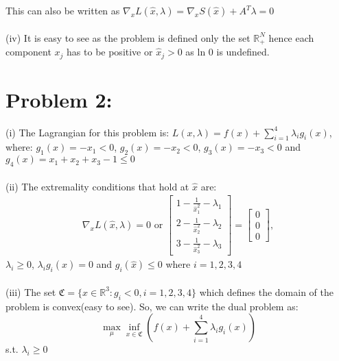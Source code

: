\documentclass[12pt]{report}
\begin{document}
This can also be written as $\nabla_x L(\hat{x},\lambda) = \nabla_xS(\hat{x})+A^T\lambda=0 $\\
\\
(iv) It is easy to see as the problem is defined only the set $\mathbb{R}^N_+$ hence each component $x_j$ has to be positive
or $\hat{x}_j>0$ as ln 0 is undefined.

\section*{Problem 2:}
(i) The Lagrangian for this problem is: $L(x,\lambda) = f(x) + \sum_{i=1}^4 \lambda_i g_i(x)$, where:
$g_1(x) = -x_1 < 0 $,  $g_2(x) = -x_2 < 0 $,  $g_3(x) = -x_3 < 0 $ and \\ $g_4(x) = x_1 + x_2 + x_3-1 \leq 0$\\
\\
(ii) The extremality conditions that hold at $\hat{x}$ are:
\begin{align*}
\nabla_x L(\hat{x},\lambda)= 0 \text{ or }
\left[ \begin{array}{c}
1-\frac{1}{\hat{x}_1^2}-\lambda_1 \\
2-\frac{1}{\hat{x}_2^2}-\lambda_2 \\
3-\frac{1}{\hat{x}_3^2}-\lambda_3 
\end{array} \right] = 
\left[ \begin{array}{c}
0 \\ 0 \\ 0
\end{array} \right],
\end{align*}
$\lambda_i\geq 0$, $\lambda_i g_i(\hat{x}) = 0$ and $g_i(\hat{x}) \leq 0$ where $i=1,2,3,4$ \\
\\
(iii) The set $\mathfrak{C}=\{ x\in \mathbb{R}^3:g_i<0, i=1,2,3,4 \}$  which defines the domain of the problem is convex(easy to
see). So, we can write the dual problem as:
$$ \max_\mu \inf_{x\in \mathfrak{C} } \left( f(x) + \sum_{i=1}^4 \lambda_i g_i(x) \right) $$ s.t. $\lambda_i\geq 0$
\end{document}
